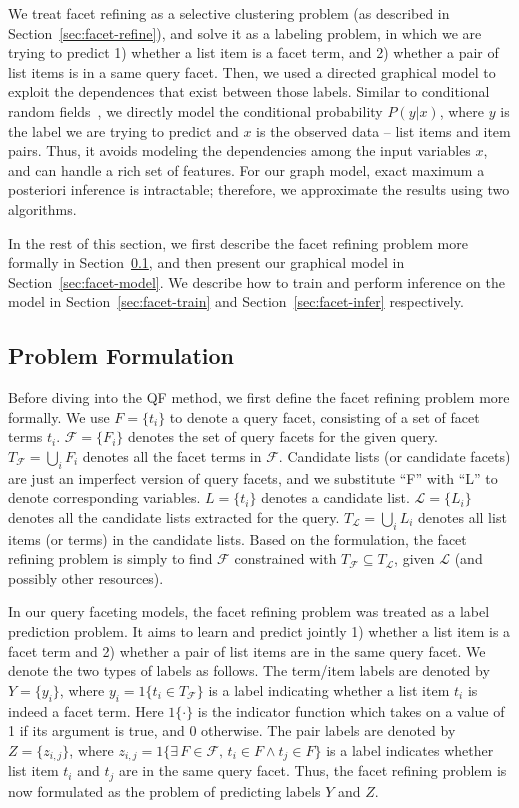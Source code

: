 We treat facet refining as a selective clustering problem (as described in Section~\ref{sec:facet-refine}), and solve it as a labeling problem, in which we are trying to predict 1) whether a list item is a facet term, and 2) whether a pair of list items is in a same query facet. Then, we used a directed graphical model to exploit the dependences that exist between those labels. Similar to conditional random fields~\cite{lafferty2001conditional}, we directly model the conditional probability $P(y|x)$, where $y$ is the label we are trying to predict and $x$ is the observed data -- list items and item pairs. Thus, it avoids modeling the dependencies among the input variables $x$, and can handle a rich set of features. For our graph model, exact maximum a posteriori inference is intractable; therefore, we approximate the results using two algorithms.

In the rest of this section, we first describe the facet refining problem more formally in Section~\ref{sec:facet-formulation}, and then present our graphical model in Section~\ref{sec:facet-model}. We describe how to train and perform inference on the model in Section~\ref{sec:facet-train} and Section~\ref{sec:facet-infer} respectively.

\subsection{Problem Formulation}
\label{sec:facet-formulation}
Before diving into the QF method, we first define the facet refining problem more formally. We use $F=\{t_i\}$ to denote a query facet, consisting of a set of facet terms $t_i$. $\mathcal{F}=\{F_i\}$ denotes the set of query facets for the given query. $T_\mathcal{F}=\bigcup_i{F_i}$ denotes all the facet terms in $\mathcal{F}$. Candidate lists (or candidate facets) are just an imperfect version of query facets, and we substitute ``F'' with ``L'' to denote corresponding variables. $L=\{t_i\}$ denotes a candidate list. $\mathcal{L}=\{L_i\}$ denotes all the candidate lists extracted for the query. $T_\mathcal{L}=\bigcup_i{L_i}$ denotes all list items (or terms) in the candidate lists. Based on the formulation, the facet refining problem is simply to find $\mathcal{F}$ constrained with $T_\mathcal{F} \subseteq T_\mathcal{L}$, given $\mathcal{L}$ (and possibly other resources).

In our query faceting models, the facet refining problem was treated as a label prediction problem. It aims to learn and predict jointly 1) whether a list item is a facet term and 2) whether a pair of list items are in the same query facet. We denote the two types of labels as follows. The term/item labels are denoted by $Y=\{y_i\}$, where $y_i = 1\{t_i\!\in\! T_{\mathcal{F}}\}$ is a label indicating whether a list item $t_i$ is indeed a facet term. Here $1\{\cdot\}$ is the indicator function which takes on a value of 1 if its argument is true, and 0 otherwise. The pair labels are denoted by $Z=\{z_{i,j}\}$, where $z_{i,j} = 1\{\exists\, F\!\in\!\mathcal{F}, \, t_{i}\!\in\!F  \wedge  t_{j}\!\in\!F \}$ is a label indicates whether list item $t_i$ and $t_j$ are in the same query facet. Thus, the facet refining problem is now formulated as the problem of predicting labels $Y$ and $Z$.

